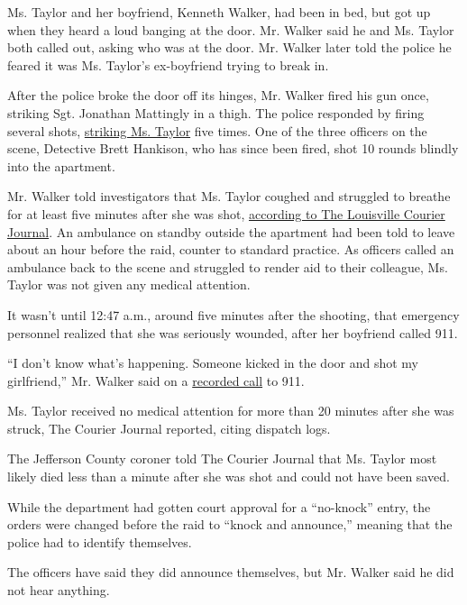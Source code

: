 Ms. Taylor and her boyfriend, Kenneth Walker, had been in bed, but got
up when they heard a loud banging at the door. Mr. Walker said he and
Ms. Taylor both called out, asking who was at the door. Mr. Walker later
told the police he feared it was Ms. Taylor's ex-boyfriend trying to
break in.

After the police broke the door off its hinges, Mr. Walker fired his gun
once, striking Sgt. Jonathan Mattingly in a thigh. The police responded
by firing several shots,
\href{https://www.nytimes3xbfgragh.onion/2020/05/14/us/breonna-taylor-louisville-shooting.html}{striking
Ms. Taylor} five times. One of the three officers on the scene,
Detective Brett Hankison, who has since been fired, shot 10 rounds
blindly into the apartment.

Mr. Walker told investigators that Ms. Taylor coughed and struggled to
breathe for at least five minutes after she was shot,
\href{https://www.courier-journal.com/story/news/crime/2020/07/17/breonna-taylor-lay-untouched-20-minutes-after-being-shot-records/5389881002/}{according
to The Louisville Courier Journal}. An ambulance on standby outside the
apartment had been told to leave about an hour before the raid, counter
to standard practice. As officers called an ambulance back to the scene
and struggled to render aid to their colleague, Ms. Taylor was not given
any medical attention.

It wasn't until 12:47 a.m., around five minutes after the shooting, that
emergency personnel realized that she was seriously wounded, after her
boyfriend called 911.

``I don't know what's happening. Someone kicked in the door and shot my
girlfriend,'' Mr. Walker said on a
\href{https://www.youtube.com/watch?v=G0EnRabtRhg}{recorded call} to
911.

Ms. Taylor received no medical attention for more than 20 minutes after
she was struck, The Courier Journal reported, citing dispatch logs.

The Jefferson County coroner told The Courier Journal that Ms. Taylor
most likely died less than a minute after she was shot and could not
have been saved.

While the department had gotten court approval for a ``no-knock'' entry,
the orders were changed before the raid to ``knock and announce,''
meaning that the police had to identify themselves.

The officers have said they did announce themselves, but Mr. Walker said
he did not hear anything.

